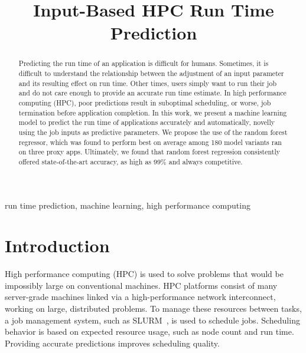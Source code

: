 \documentclass[conference, 10pt, onecolumn, draftclsnofoot]{IEEEtran}
\begin{document}
\title{Input-Based HPC Run Time Prediction}

\author{
}

\maketitle

\begin{abstract}
Predicting the run time of an application is difficult for humans.
Sometimes, it is difficult to understand the relationship between the adjustment of an input parameter and its resulting effect on run time.
Other times, users simply want to run their job and do not care enough to provide an accurate run time estimate.
In high performance computing (HPC), poor predictions result in suboptimal scheduling, or worse, job termination before application completion.
In this work, we present a machine learning model to predict the run time of applications accurately and automatically, novelly using the job inputs as predictive parameters.
We propose the use of the random forest regressor, which was found to perform best on average among 180 model variants ran on three proxy apps.
Ultimately, we found that random forest regression consistently offered state-of-the-art accuracy, as high as 99\% and always competitive.
\end{abstract}

\begin{IEEEkeywords}
run time prediction, machine learning, high performance computing
\end{IEEEkeywords}

\section{Introduction}

High performance computing (HPC) is used to solve problems that would be impossibly large on conventional machines.
HPC platforms consist of many server-grade machines linked via a high-performance network interconnect, working on large, distributed problems.
To manage these resources between tasks, a job management system, such as SLURM~\cite{SLURM}, is used to schedule jobs.
Scheduling behavior is based on expected resource usage, such as node count and run time.
Providing accurate predictions improves scheduling quality.
\end{document}
